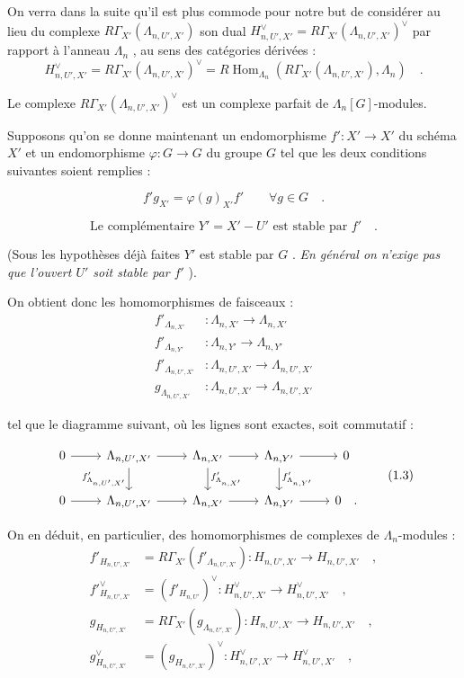 \documentclass[11pt]{article}
\DeclareMathOperator{\Hom}{Hom}
\providecommand{\Hom}{\operatorname{Hom}}
\providecommand{\La}{\Lambda}
\providecommand{\Hom}{\operatorname{Hom}}
\begin{document}
On verra dans la suite qu'il est plus commode pour notre but de considérer au lieu du complexe $R\Gamma_{X'}(\La_{n,U',X'})$ son dual $H_{n,U',X'}^\vee = R\Gamma_{X'}(\La_{n,U',X'})^\vee$ par rapport à l'anneau $\La_n$ , au sens des catégories dérivées :
\[
H_{n,U',X'}^\vee = R\Gamma_{X'}(\La_{n,U',X'})^\vee = R\Hom_{\La_n}(R\Gamma_{X'}(\La_{n,U',X'}), \La_n) \quad .
\]

Le complexe $R\Gamma_{X'}(\La_{n,U',X'})^\vee$ est un complexe parfait de $\La_n[G]$-modules.

Supposons qu'on se donne maintenant un endomorphisme $f' : X' \to X'$ du schéma $X'$ et un endomorphisme $\varphi : G \to G$ du groupe $G$ tel que les deux conditions suivantes soient remplies :

\begin{equation}\tag{1.1}
f' g_{X'} = \varphi(g)_{X'} f' \qquad \forall g \in G \quad .
\end{equation}

\begin{equation}\tag{1.2}
\text{Le complémentaire } Y' = X' - U' \text{ est stable par } f' \quad .
\end{equation}

(Sous les hypothèses déjà faites $Y'$ est stable par $G$ . \emph{En général on n'exige pas que l'ouvert $U'$ soit stable par $f'$} ).

On obtient donc les homomorphismes de faisceaux :
\begin{align*}
f'_{\La_{n,X'}} &: \La_{n,X'} \longrightarrow \La_{n,X'} \\
f'_{\La_{n,Y'}} &: \La_{n,Y'} \longrightarrow \La_{n,Y'} \\
f'_{\La_{n,U',X'}} &: \La_{n,U',X'} \longrightarrow \La_{n,U',X'} \\
g_{\La_{n,U',X'}} &: \La_{n,U',X'} \longrightarrow \La_{n,U',X'}
\end{align*}

tel que le diagramme suivant, où les lignes sont exactes, soit commutatif :

\[
\begin{tikzcd}
0 \arrow[r] & \La_{n,U',X'} \arrow[r] \arrow[d, "f'_{\La_{n,U',X'}}"'] & \La_{n,X'} \arrow[r] \arrow[d, "f'_{\La_{n,X'}}"] & \La_{n,Y'} \arrow[r] \arrow[d, "f'_{\La_{n,Y'}}"] & 0 \\
0 \arrow[r] & \La_{n,U',X'} \arrow[r] & \La_{n,X'} \arrow[r] & \La_{n,Y'} \arrow[r] & 0 \quad .
\end{tikzcd}
\tag{1.3}
\]

On en déduit, en particulier, des homomorphismes de complexes de $\La_n$-modules :
\begin{align*}
f'_{H_{n,U',X'}} &= R\Gamma_{X'}(f'_{\La_{n,U',X'}}) : H_{n,U',X'} \longrightarrow H_{n,U',X'} \quad , \\
f'^\vee_{H_{n,U',X'}} &= (f'_{H_{n,U'}})^\vee : H_{n,U',X'}^\vee \longrightarrow H_{n,U',X'}^\vee \quad , \\
g_{H_{n,U',X'}} &= R\Gamma_{X'}(g_{\La_{n,U',X'}}) : H_{n,U',X'} \longrightarrow H_{n,U',X'} \quad , \\
g^\vee_{H_{n,U',X'}} &= (g_{H_{n,U',X'}})^\vee : H_{n,U',X'}^\vee \longrightarrow H_{n,U',X'}^\vee \quad ,
\end{align*}
\end{document}
